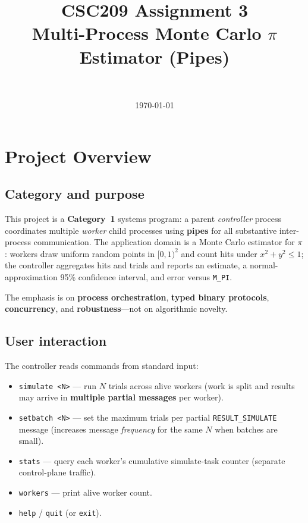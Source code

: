 \documentclass[11pt]{article}
\title{CSC209 Assignment 3\\Multi-Process Monte Carlo $\pi$ Estimator (Pipes)}
\author{\teamname\\\members}
\date{\today}
\begin{document}
\maketitle

\section{Project Overview}
\label{sec:overview}

\subsection{Category and purpose}
This project is a \textbf{Category~1} systems program: a parent \emph{controller} process coordinates multiple \emph{worker} child processes using \textbf{pipes} for all substantive inter-process communication. The application domain is a Monte Carlo estimator for $\pi$: workers draw uniform random points in $[0,1)^2$ and count hits under $x^2+y^2\le 1$; the controller aggregates hits and trials and reports an estimate, a normal-approximation 95\% confidence interval, and error versus \texttt{M\_PI}.

The emphasis is on \textbf{process orchestration}, \textbf{typed binary protocols}, \textbf{concurrency}, and \textbf{robustness}---not on algorithmic novelty.

\subsection{User interaction}
The controller reads commands from standard input:
\begin{itemize}
  \item \texttt{simulate <N>} --- run $N$ trials across alive workers (work is split and results may arrive in \textbf{multiple partial messages} per worker).
  \item \texttt{setbatch <N>} --- set the maximum trials per partial \texttt{RESULT\_SIMULATE} message (increases message \emph{frequency} for the same $N$ when batches are small).
  \item \texttt{stats} --- query each worker's cumulative simulate-task counter (separate control-plane traffic).
  \item \texttt{workers} --- print alive worker count.
  \item \texttt{help} / \texttt{quit} (or \texttt{exit}).
\end{itemize}
\end{document}
